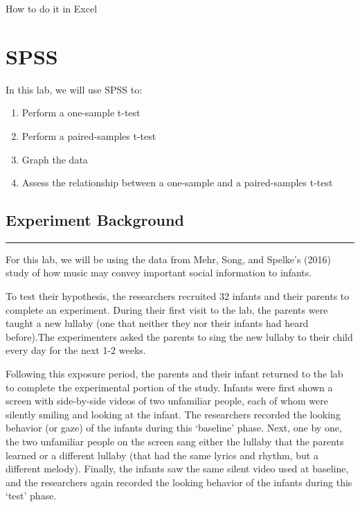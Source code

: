 \documentclass[
]{book}
\providecommand{\tightlist}{%
  \setlength{\itemsep}{0pt}\setlength{\parskip}{0pt}}
\begin{document}
How to do it in Excel

\hypertarget{spss-6}{%
\section{SPSS}\label{spss-6}}

In this lab, we will use SPSS to:

\begin{enumerate}
\def\labelenumi{\arabic{enumi}.}
\tightlist
\item
  Perform a one-sample t-test
\item
  Perform a paired-samples t-test
\item
  Graph the data
\item
  Assess the relationship between a one-sample and a paired-samples t-test
\end{enumerate}

\hypertarget{experiment-background-1}{%
\subsection{Experiment Background}\label{experiment-background-1}}

\begin{center}\rule{0.5\linewidth}{0.5pt}\end{center}

For this lab, we will be using the data from Mehr, Song, and Spelke's (2016) study of how music may convey important social information to infants.

To test their hypothesis, the researchers recruited 32 infants and their parents to complete an experiment. During their first visit to the lab, the parents were taught a new lullaby (one that neither they nor their infants had heard before).The experimenters asked the parents to sing the new lullaby to their child every day for the next 1-2 weeks.

Following this exposure period, the parents and their infant returned to the lab to complete the experimental portion of the study. Infants were first shown a screen with side-by-side videos of two unfamiliar people, each of whom were silently smiling and looking at the infant. The researchers recorded the looking behavior (or gaze) of the infants during this `baseline' phase. Next, one by one, the two unfamiliar people on the screen sang either the lullaby that the parents learned or a different lullaby (that had the same lyrics and rhythm, but a different melody). Finally, the infants saw the same silent video used at baseline, and the researchers again recorded the looking behavior of the infants during this `test' phase.
\end{document}
